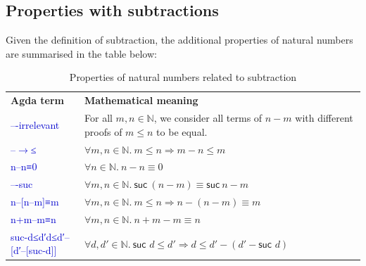\documentclass[12pt,a4paper]{report}
\theoremstyle{definition}
\newcommand{\mb}[1]{\textcolor{mediumblue}{#1}}
\newcommand{\mbt}[1]{\mb{\textsf{#1}}}
\newcommand{\bN}{\ensuremath{\mathbb{N}}}
\begin{document}
    \subsection{Properties with subtractions} \label{subsec: properties_sub}
    Given the definition of subtraction, the additional properties of natural numbers are summarised in the table below:
    \begin{table}[H]
        \centering
        \begin{tabular}{|l|l|}
            \hline
            \textbf{Agda term} & \textbf{Mathematical meaning} \\
            \hhline{|=|=|}
            \mbt{–-irrelevant} & \makecell{For all $m, n \in \bN$, we consider all terms of $n-m$ \\ with different proofs of $m \leq n$ to be equal.} \\
            \hline
            \mbt{–}\mb{$\to$}\mbt{≤}& $\forall m, n \in \bN.\ m \leq n \Rightarrow m - n \leq m$ \\
            \hline
            \mbt{n–n≡0} & $\forall n \in \bN.\ n - n \equiv 0$ \\
            \hline
            \mbt{–-suc} & $\forall m, n \in \bN.\ \mathsf{suc}\ (n - m) \equiv \mathsf{suc}\ n - m$ \\
            \hline
            \mbt{n–[n–m]≡m} & $\forall m, n \in \bN.\ m \leq n \Rightarrow n - (n - m) \equiv m$ \\
            \hline
            \mbt{n+m–m≡n} & $\forall m, n \in \bN.\ n + m - m \equiv n$ \\
            \hline
            \mbt{suc-d≤d′}\mb{\to}\mbt{d≤d′–[d′–[suc-d]]} & $\forall d, d' \in \bN.\ \textsf{suc } d \leq d' \Rightarrow d \leq d' - (d' - \textsf{suc } d)$ \\
            \hline
        \end{tabular}
        \caption{Properties of natural numbers related to subtraction}
        \label{tab: properties_subtraction}
    \end{table}
\end{document}
